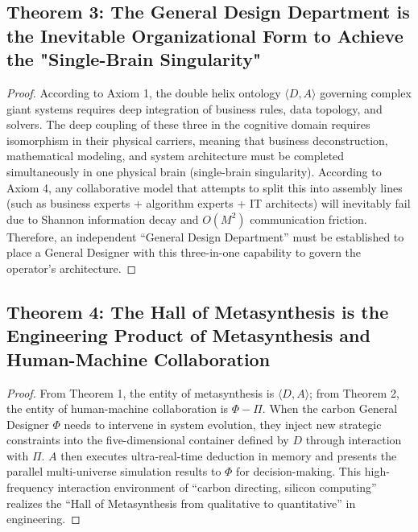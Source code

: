 \documentclass{article}
\begin{document}
\subsection*{Theorem 3: The General Design Department is the Inevitable Organizational Form to Achieve the "Single-Brain Singularity"}
\begin{proof}
According to Axiom 1, the double helix ontology $\langle D, A \rangle$ governing complex giant systems requires deep integration of business rules, data topology, and solvers. The deep coupling of these three in the cognitive domain requires isomorphism in their physical carriers, meaning that business deconstruction, mathematical modeling, and system architecture must be completed simultaneously in one physical brain (single-brain singularity). According to Axiom 4, any collaborative model that attempts to split this into assembly lines (such as business experts + algorithm experts + IT architects) will inevitably fail due to Shannon information decay and $O(M^2)$ communication friction. Therefore, an independent ``General Design Department'' must be established to place a General Designer with this three-in-one capability to govern the operator's architecture.
\end{proof}

\subsection*{Theorem 4: The Hall of Metasynthesis is the Engineering Product of Metasynthesis and Human-Machine Collaboration}
\begin{proof}
From Theorem 1, the entity of metasynthesis is $\langle D, A \rangle$; from Theorem 2, the entity of human-machine collaboration is $\Phi - \Pi$. When the carbon General Designer $\Phi$ needs to intervene in system evolution, they inject new strategic constraints into the five-dimensional container defined by $D$ through interaction with $\Pi$. $A$ then executes ultra-real-time deduction in memory and presents the parallel multi-universe simulation results to $\Phi$ for decision-making. This high-frequency interaction environment of ``carbon directing, silicon computing'' realizes the ``Hall of Metasynthesis from qualitative to quantitative'' in engineering.
\end{proof}
\end{document}
